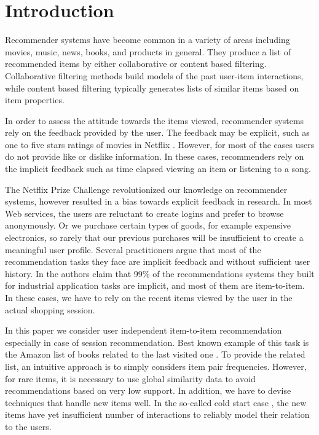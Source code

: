 \section{Introduction}

Recommender systems \cite{ricci2011introduction} have become common in a variety of areas including movies, music, news, books, and products in general.
They produce a list of recommended items by either collaborative or content based filtering.
Collaborative filtering methods \cite{amazon-recommender,sarwar01item} build models of the past user-item interactions, while content based filtering \cite{lops2011content} typically generates lists of similar items
based on item properties.

In order to assess the attitude towards the items viewed, recommender systems rely on the feedback provided by the user.
The feedback may be explicit, such as one to five stars ratings of movies in Netflix \cite{adhikari2012unreeling}. 
However, for most of the cases users do not provide like or dislike information. In these cases, recommenders rely on the implicit feedback such as time elapsed viewing an item or listening to a song.  

The Netflix Prize Challenge \cite{bennett2007netflix,koren2009bellkor} revolutionized our knowledge on recommender systems, however resulted in a bias towards explicit feedback in research.
In most Web services, the users are reluctant to create logins and prefer to browse anonymously.  Or we purchase certain types of goods, for example expensive electronics, so rarely that our previous purchases will be insufficient to create a meaningful user profile.
Several practitioners \cite{koenigstein2013towards} argue that most of the recommendation tasks they face are implicit feedback and without sufficient user history.
In \cite{pilaszy2015neighbor} the authors claim that 99\% of the recommendations systems they built for industrial application tasks are implicit, and most of them are item-to-item. 
In these cases, we have to rely on the recent items viewed by the user in the actual shopping session.


In this paper we consider user independent item-to-item recommendation \cite{sarwar01item,amazon-recommender} especially in case of session recommendation. 
Best known example of this task is the Amazon list of books related to the last visited one \cite{amazon-recommender}. 
To provide the related list, an intuitive approach is to simply considers item pair frequencies.  However, for rare items, it is necessary to use global similarity data to avoid recommendations based on very low support.
In addition, we have to devise techniques that handle new items well. In the so-called cold start case \cite{schein2002methods}, the new items have yet insufficient number of interactions to reliably model their relation to the users.

